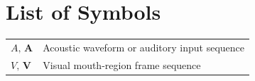 \chapter*{List of Symbols}

\begin{table}[ht!]
		\begin{tabular}{l l}
			$A,\,\mathbf{A}$ & Acoustic waveform or auditory input sequence \\
            $V,\,\mathbf{V}$ & Visual mouth-region frame sequence \\
		\end{tabular}
\end{table}
